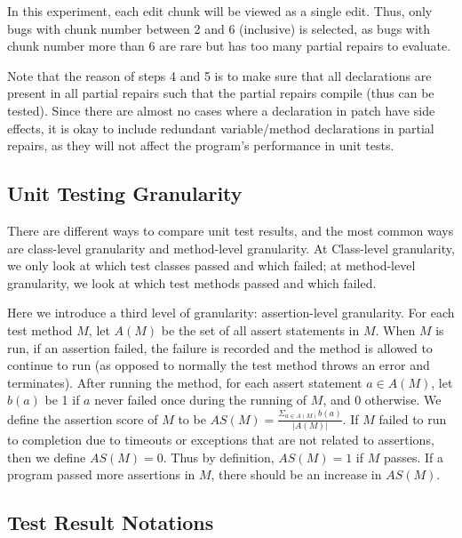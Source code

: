 \documentclass[sigconf, timestamp-false, anonymous=true]{acmart}
\begin{document}
In this experiment, each edit chunk will be viewed as a single edit. Thus, only bugs with chunk number between 2 and 6 (inclusive) is selected, as bugs with chunk number more than 6 are rare but has too many partial repairs to evaluate.

Note that the reason of steps 4 and 5 is to make sure that all declarations are present in all partial repairs such that the partial repairs compile (thus can be tested). Since there are almost no cases where a declaration in patch have side effects, it is okay to include redundant variable/method declarations in partial repairs, as they will not affect the program's performance in unit tests. 

\subsection{Unit Testing Granularity}

There are different ways to compare unit test results, and the most common ways are class-level granularity and method-level granularity. At Class-level granularity, we only look at which test classes passed and which failed; at method-level granularity, we look at which test methods passed and which failed.

Here we introduce a third level of granularity: assertion-level granularity. For each test method $M$, let $A(M)$ be the set of all assert statements in $M$. When $M$ is run, if an assertion failed, the failure is recorded and the method is allowed to continue to run (as opposed to normally the test method throws an error and terminates). After running the method, for each assert statement $a\in A(M)$, let $b(a)$ be 1 if $a$ never failed once during the running of $M$, and 0 otherwise. We define the assertion score of $M$ to be $AS(M)=\frac{\Sigma_{a\in A(M)}b(a)}{|A(M)|}$. If $M$ failed to run to completion due to timeouts or exceptions that are not related to assertions, then we define $AS(M)=0$. Thus by definition, $AS(M)=1$ if $M$ passes. If a program passed more assertions in $M$, there should be an increase in $AS(M)$.

\subsection{Test Result Notations}
\end{document}
